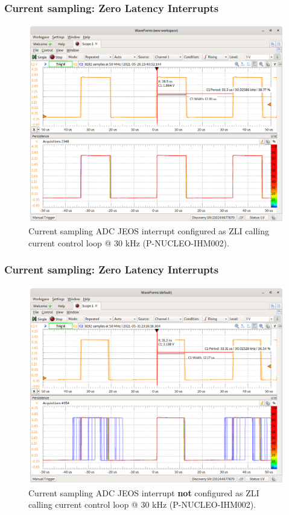 \documentclass[handout]{beamer}
\begin{document}
\begin{frame}
  \frametitle{Current sampling: Zero Latency Interrupts}

  \begin{figure}
    \centering
    \includegraphics[scale=0.19]{zli-cloop.png}
    \caption{Current sampling ADC JEOS interrupt configured as ZLI calling
      current control loop @ 30 kHz (P-NUCLEO-IHM002).}
  \end{figure}
\end{frame}

\begin{frame}
  \frametitle{Current sampling: Zero Latency Interrupts}

  \begin{figure}
    \centering
    \includegraphics[scale=0.19]{zli-disabled-cloop.png}
    \caption{Current sampling ADC JEOS interrupt \textbf{not} configured as ZLI
      calling current control loop @ 30 kHz (P-NUCLEO-IHM002).}
  \end{figure}
\end{frame}
\end{document}
